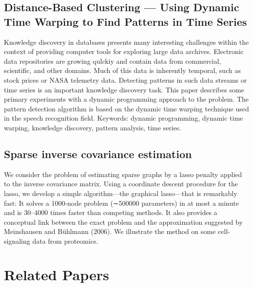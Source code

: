\documentclass{llncs}
\begin{document}
\subsection{Distance-Based Clustering --- Using Dynamic Time Warping to Find Patterns in Time Series\cite{berndt1994using}}
Knowledge discovery in databases presents many interesting challenges within the context of providing computer tools for exploring large data archives. Electronic data repositories are growing qulckiy and contain data from commercial, scientific, and other domains. Much of this data is inherently temporal, such as stock prices or NASA telemetry data. Detecting patterns in such data streams or time series is an important knowledge discovery task. This paper describes some primary experiments with a dynamic programming approach to the problem. The pattern detection algorithm is based on the dynamic time warping technique used in the speech recognition field. Keywords: dynamic programming, dynamic time warping, knowledge discovery, pattern analysis, time series.

\subsection{Sparse inverse covariance estimation \cite{doi:10.1093/biostatistics/kxm045}}
We consider the problem of estimating sparse graphs by a lasso penalty applied to the inverse covariance matrix. Using a coordinate descent procedure for the lasso, we develop a simple algorithm—the graphical lasso—that is remarkably fast: It solves a 1000-node problem (∼500000 parameters) in at most a minute and is 30–4000 times faster than competing methods. It also provides a conceptual link between the exact problem and the approximation suggested by Meinshausen and Bühlmann (2006). We illustrate the method on some cell-signaling data from proteomics.

\section{Related Papers}
\end{document}

